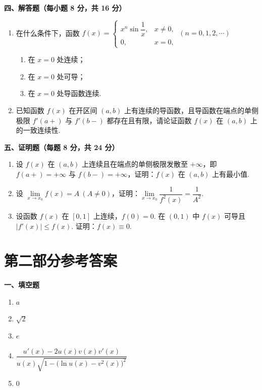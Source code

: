 \documentclass[a4paper,11pt]{ctexart}
\begin{document}
\vspace{0.8em}
\textbf{四、解答题（每小题 8 分，共 16 分）}

\begin{enumerate}[label=\arabic*., leftmargin=2em, itemsep=0.9em, topsep=0.5em]
  \item 在什么条件下，函数 $f(x)=\begin{cases} x^n\sin\dfrac{1}{x}, & x\neq 0, \\ 0, & x=0, \end{cases}\ (n=0,1,2,\cdots)$
  \begin{enumerate}[label=(\arabic*), leftmargin=2.2em, itemsep=0.25em, topsep=0.3em]
    \item 在 $x=0$ 处连续；
    \item 在 $x=0$ 处可导；
    \item 在 $x=0$ 处导函数连续.
  \end{enumerate}

  \item 已知函数 $f(x)$ 在开区间 $(a,b)$ 上有连续的导函数，且导函数在端点的单侧极限 $f'(a+)$ 与 $f'(b-)$ 都存在且有限，请论证函数 $f(x)$ 在 $(a,b)$ 上的一致连续性.
\end{enumerate}

\vspace{0.8em}
\textbf{五、证明题（每题 8 分，共 24 分）}

\begin{enumerate}[label=\arabic*., leftmargin=2em, itemsep=0.9em, topsep=0.5em]
  \item 设 $f(x)$ 在 $(a,b)$ 上连续且在端点的单侧极限发散至 $+\infty$，即 $f(a+)=+\infty$ 与 $f(b-)=+\infty$，证明：$f(x)$ 在 $(a,b)$ 上有最小值.

  \item 设 $\lim\limits_{x\to x_0}f(x)=A\ (A\neq 0)$，证明：$\lim\limits_{x\to x_0}\dfrac{1}{f^2(x)}=\dfrac{1}{A^2}$.

  \item 设函数 $f(x)$ 在 $[0,1]$ 上连续，$f(0)=0$. 在 $(0,1)$ 中 $f(x)$ 可导且 $|f'(x)|\le f(x)$. 证明：$f(x)\equiv 0$.
\end{enumerate}

\newpage
\section*{第二部分\quad 参考答案}

\textbf{一、填空题}

\begin{enumerate}[label=\arabic*., leftmargin=2em, itemsep=0.7em, topsep=0.4em]
  \item $a$
  \item $\sqrt{2}$
  \item $e$
  \item $\dfrac{u'(x)-2u(x)v(x)v'(x)}{u(x)\sqrt{1-\bigl(\ln u(x)-v^2(x)\bigr)^2}}$
  \item $0$
\end{enumerate}
\end{document}
